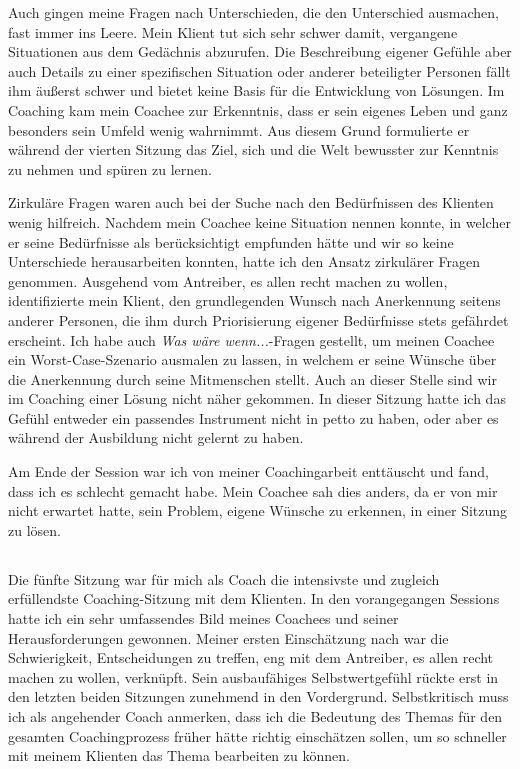 \documentclass[11pt,a4paper]{article}
\begin{document}
Auch gingen meine Fragen nach Unterschieden, die den Unterschied ausmachen, fast immer ins Leere. Mein Klient tut sich sehr schwer damit, vergangene Situationen aus dem Gedächnis abzurufen. Die Beschreibung eigener Gefühle aber auch Details zu einer spezifischen Situation oder anderer beteiligter Personen fällt ihm äußerst schwer und bietet keine Basis für die Entwicklung von Lösungen. Im Coaching kam mein Coachee zur Erkenntnis, dass er sein eigenes Leben und ganz besonders sein Umfeld wenig wahrnimmt. Aus diesem Grund formulierte er während der vierten Sitzung das Ziel, sich und die Welt bewusster zur Kenntnis zu nehmen und spüren zu lernen.

Zirkuläre Fragen waren auch bei der Suche nach den Bedürfnissen des Klienten wenig hilfreich. Nachdem mein Coachee keine Situation nennen konnte, in welcher er seine Bedürfnisse als berücksichtigt empfunden hätte und wir so keine Unterschiede herausarbeiten konnten, hatte ich den Ansatz zirkulärer Fragen genommen. Ausgehend vom Antreiber, es allen recht machen zu wollen, identifizierte mein Klient, den grundlegenden Wunsch nach Anerkennung seitens anderer Personen, die ihm durch Priorisierung eigener Bedürfnisse stets gefährdet erscheint. Ich habe auch \textsl{Was wäre wenn...}-Fragen gestellt, um meinen Coachee ein Worst-Case-Szenario ausmalen zu lassen, in welchem er seine Wünsche über die Anerkennung durch seine Mitmenschen stellt. Auch an dieser Stelle sind wir im Coaching einer Lösung nicht näher gekommen. In dieser Sitzung hatte ich das Gefühl entweder ein passendes Instrument nicht in petto zu haben, oder aber es während der Ausbildung nicht gelernt zu haben.

Am Ende der Session war ich von meiner Coachingarbeit enttäuscht und fand, dass ich es schlecht gemacht habe. Mein Coachee sah dies anders, da er von mir nicht erwartet hatte, sein Problem, eigene Wünsche zu erkennen, in einer Sitzung zu lösen.





\subsection*{\color{Orange}{Fünfte Sitzung: Erneute Themensammlung}}


Die fünfte Sitzung war für mich als Coach die intensivste und zugleich erfüllendste Coaching-Sitzung mit dem Klienten. In den vorangegangen Sessions hatte ich ein sehr umfassendes Bild meines Coachees und seiner Herausforderungen gewonnen. Meiner ersten Einschätzung nach war die Schwierigkeit, Entscheidungen zu treffen, eng mit dem Antreiber, es allen recht machen zu wollen, verknüpft. Sein ausbaufähiges Selbstwertgefühl rückte erst in den letzten beiden Sitzungen zunehmend in den Vordergrund. Selbstkritisch muss ich als angehender Coach anmerken, dass ich die Bedeutung des Themas für den gesamten Coachingprozess früher hätte richtig einschätzen sollen, um so schneller mit meinem Klienten das Thema bearbeiten zu können. 
\end{document}
